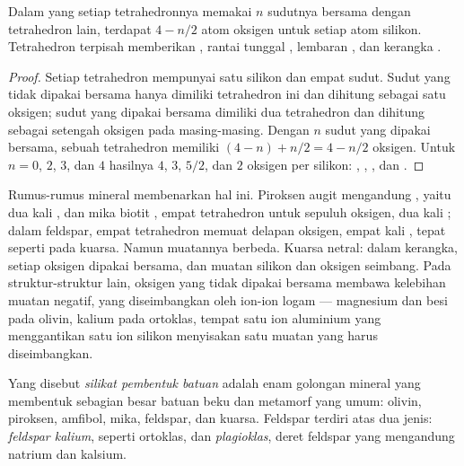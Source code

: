 
\begin{proposition}\label{prop:g11:minerals:sharing}
Dalam  yang setiap tetrahedronnya memakai $n$ sudutnya bersama dengan
tetrahedron lain, terdapat $4 - n/2$ atom oksigen untuk setiap atom silikon.
Tetrahedron terpisah memberikan , rantai tunggal , lembaran
, dan kerangka .
\end{proposition}

\begin{proof}
Setiap tetrahedron mempunyai satu silikon dan empat sudut. Sudut yang tidak
dipakai bersama hanya dimiliki tetrahedron ini dan dihitung sebagai satu oksigen;
sudut yang dipakai bersama dimiliki dua tetrahedron dan dihitung sebagai setengah
oksigen pada masing-masing. Dengan $n$ sudut yang dipakai bersama, sebuah
tetrahedron memiliki $(4 - n) + n/2 = 4 - n/2$ oksigen.
Untuk $n = 0$, $2$, $3$, dan $4$ hasilnya $4$, $3$, $5/2$, dan $2$ oksigen
per silikon: , , , dan .
\end{proof}

Rumus-rumus mineral membenarkan hal ini. Piroksen augit mengandung
, yaitu dua kali , dan mika biotit ,
empat tetrahedron untuk sepuluh oksigen, dua kali ; dalam feldspar,
empat tetrahedron memuat delapan oksigen, empat kali , tepat seperti
pada kuarsa. Namun muatannya berbeda. Kuarsa netral: dalam kerangka, setiap
oksigen dipakai bersama, dan muatan silikon dan oksigen seimbang. Pada
struktur-struktur lain, oksigen yang tidak dipakai bersama membawa kelebihan
muatan negatif, yang diseimbangkan oleh ion-ion logam --- magnesium dan besi pada
olivin, kalium pada ortoklas, tempat satu ion aluminium  yang
menggantikan satu ion silikon  menyisakan satu muatan yang harus
diseimbangkan.

\begin{definition}\label{def:g11:minerals:rock-forming}
Yang disebut \emph{silikat pembentuk batuan}
adalah enam golongan mineral  yang membentuk sebagian besar batuan beku
dan metamorf yang umum: olivin, piroksen, amfibol, mika, feldspar, dan kuarsa.
Feldspar terdiri atas dua jenis: \emph{feldspar kalium}, seperti ortoklas, dan
\emph{plagioklas}, deret feldspar yang mengandung natrium dan kalsium.
\end{definition}

